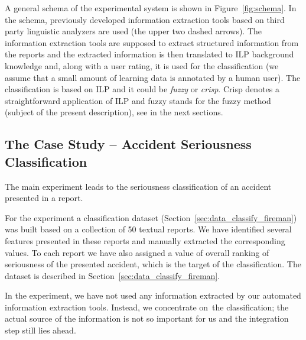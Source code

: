 A general schema of the experimental system is shown in Figure~\ref{fig:schema}. In the schema, previously developed information extraction tools based on third party linguistic analyzers are used (the upper two dashed arrows). The information extraction tools are supposed to extract structured information from the reports and the extracted information is then translated to ILP background knowledge and, along with a user rating, it is used for the classification (we assume that a small amount of learning data is annotated by a human user). The classification is based on ILP and it could be \emph{fuzzy} or \emph{crisp}. Crisp denotes a straightforward application of ILP and fuzzy stands for the fuzzy method (subject of the present description), see in the next sections.



\subsection{The Case Study -- Accident Seriousness Classification} \label{sec:fuzzy_case}



The main experiment leads to the seriousness classification of an accident presented in a report. %

For the experiment a classification dataset (Section~\ref{sec:data_classify_fireman}) was built based on a collection of 50 textual reports. We have identified several features presented in these reports and manually extracted the corresponding values. To each report we have also assigned a value of overall ranking of seriousness of the presented accident, which is the target of the classification. The dataset is described in Section~\ref{sec:data_classify_fireman}. 

In the experiment, we have not used any information extracted by our automated information extraction tools. Instead, we concentrate on~the classification; the actual source of the information is not so important for us and the integration step still lies ahead.






